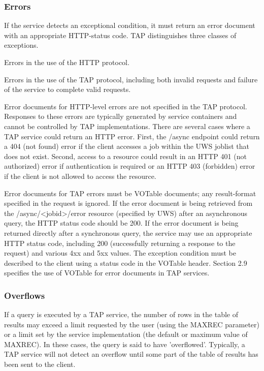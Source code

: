 \documentclass[11pt,a4paper]{ivoa}
\begin{document}
\subsubsection{Errors}
If the service detects an exceptional condition, it must return an error 
document with an appropriate HTTP-status code. TAP distinguishes three classes 
of exceptions.

Errors in the use of the HTTP protocol. 

Errors in the use of the TAP protocol, including both invalid requests and 
failure of the service to complete valid requests. 

Error documents for HTTP-level errors are not specified in the TAP protocol. 
Responses to these errors are typically generated by service containers and 
cannot be controlled by TAP implementations. There are several cases where a TAP 
service could return an HTTP error. First, the /async endpoint could return a 
404 (not found) error if the client accesses a job within the UWS joblist that 
does not exist. Second, access to a resource could result in an HTTP 401 (not 
authorized) error if authentication is required or an HTTP 403 (forbidden) error 
if the client is not allowed to access the resource.

Error documents for TAP errors must be VOTable documents;  any result-format 
specified in the request is ignored. If the error document is being retrieved 
from the /async/<jobid>/error resource (specified by UWS) after an asynchronous 
query, the HTTP status code should be 200. If the error document is being 
returned directly after a synchronous query, the service may use an appropriate 
HTTP status code, including 200 (successfully returning a response to the 
request) and various 4xx and 5xx values. The exception condition must be 
described to the client using a status code in the VOTable header.  Section   
2.9 specifies the use of VOTable for error documents in TAP services. 

\subsubsection{Overflows}
If a query is executed by a TAP service, the number of rows in the table of 
results may exceed a limit requested by the user (using the MAXREC parameter) or 
a limit set by the service implementation (the default or maximum value of 
MAXREC). In these cases, the query is said to have 'overflowed'. Typically, a 
TAP service will not detect an overflow until some part of the table of results 
has been sent to the client.
\end{document}
